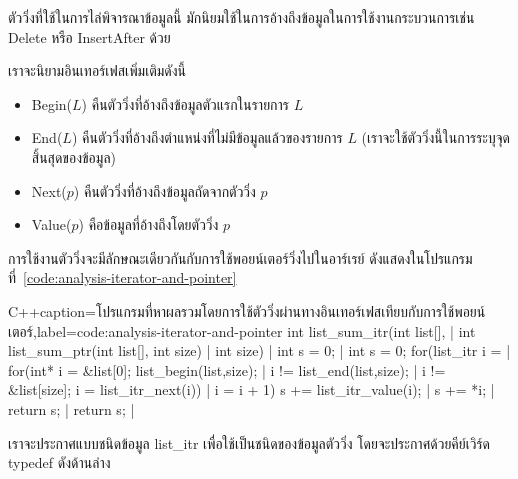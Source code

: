 ตัว{\wbr}วิ่ง{\wbr}ที่{\wbr}ใช้{\wbr}ใน{\wbr}การ{\wbr}ไล่{\wbr}พิจารณา{\wbr}ข้อมูล{\wbr}นี้ มัก{\wbr}นิยม{\wbr}ใช้{\wbr}ใน{\wbr}การ{\wbr}อ้าง{\wbr}ถึง{\wbr}ข้อมูล{\wbr}ใน{\wbr}การ{\wbr}ใช้{\wbr}งาน{\wbr}กระบวนการ{\wbr}เช่น{\wbr}
Delete หรือ InsertAfter ด้วย{\wbr}

เรา{\wbr}จะ{\wbr}นิยาม{\wbr}อิน{\wbr}เทอร์เฟส{\wbr}เพิ่มเติม{\wbr}ดังนี้{\wbr}
\begin{itemize}
\item Begin($L$) คืนตัว{\wbr}วิ่ง{\wbr}ที่{\wbr}อ้าง{\wbr}ถึง{\wbr}ข้อมูล{\wbr}ตัว{\wbr}แรก{\wbr}ใน{\wbr}รายการ $L$
\item End($L$) คืนตัว{\wbr}วิ่ง{\wbr}ที่{\wbr}อ้าง{\wbr}ถึง{\wbr}ตำแหน่ง{\wbr}ที่{\wbr}ไม่{\wbr}มี{\wbr}ข้อมูล{\wbr}แล้ว{\wbr}ของ{\wbr}รายการ $L$
  (เรา{\wbr}จะ{\wbr}ใช้{\wbr}ตัว{\wbr}วิ่ง{\wbr}นี้{\wbr}ใน{\wbr}การ{\wbr}ระบุ{\wbr}จุดสิ้นสุด{\wbr}ของ{\wbr}ข้อมูล)
\item Next($p$) คืนตัว{\wbr}วิ่ง{\wbr}ที่{\wbr}อ้าง{\wbr}ถึง{\wbr}ข้อมูล{\wbr}ถัดจาก{\wbr}ตัว{\wbr}วิ่ง $p$
\item Value($p$) คือ{\wbr}ข้อมูล{\wbr}ที่{\wbr}อ้าง{\wbr}ถึง{\wbr}โดย{\wbr}ตัว{\wbr}วิ่ง $p$
\end{itemize}

การ{\wbr}ใช้{\wbr}งาน{\wbr}ตัว{\wbr}วิ่ง{\wbr}จะ{\wbr}มี{\wbr}ลักษณะ{\wbr}เดียวกัน{\wbr}กับ{\wbr}การ{\wbr}ใช้{\wbr}พอยน์เตอร์{\wbr}วิ่ง{\wbr}ไป{\wbr}ใน{\wbr}อาร์เรย์ ดัง{\wbr}แสดง{\wbr}ใน{\wbr}โปรแกรม{\wbr}ที่~\ref{code:analysis-iterator-and-pointer}

\latintext
\begin{codelist}{C++}{caption={\thaitext โปรแกรม{\wbr}ที่{\wbr}หา{\wbr}ผลรวม{\wbr}โดย{\wbr}การ{\wbr}ใช้{\wbr}ตัว{\wbr}วิ่ง{\wbr}ผ่าน{\wbr}ทาง{\wbr}อิน{\wbr}เทอร์เฟส{\wbr}เทียบ{\wbr}กับ{\wbr}การ{\wbr}ใช้{\wbr}พอยน์เตอร์\latintext},label=code:analysis-iterator-and-pointer}
int list_sum_itr(int list[],      | int list_sum_ptr(int list[],
                 int size)        |                  int size)
{                                 | {
  int s = 0;                      |   int s = 0;
  for(list_itr i =                |   for(int* i = &list[0];
        list_begin(list,size);    | 
      i != list_end(list,size);   |       i != &list[size];
      i = list_itr_next(i)) {     |       i = i + 1) {
    s += list_itr_value(i);       |     s += *i;
  }                               |   }
  return s;                       |   return s;
}                                 | }
\end{codelist}
\thaitext

เรา{\wbr}จะ{\wbr}ประกาศ{\wbr}แบบ{\wbr}ชนิด{\wbr}ข้อมูล {\ct list\_itr} เพื่อ{\wbr}ใช้{\wbr}เป็น{\wbr}ชนิด{\wbr}ของ{\wbr}ข้อมูล{\wbr}ตัว{\wbr}วิ่ง{\wbr}
โดย{\wbr}จะ{\wbr}ประกาศ{\wbr}ด้วย{\wbr}คีย์{\wbr}เวิร์ด {\ct typedef} ดัง{\wbr}ด้าน{\wbr}ล่าง{\wbr}

